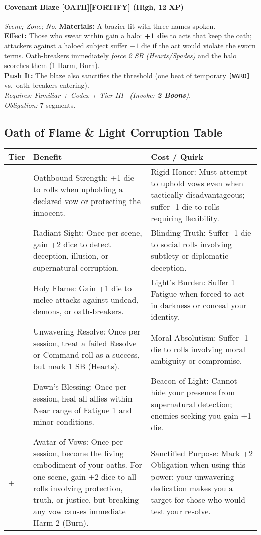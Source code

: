 \paragraph{Covenant Blaze \textnormal{[OATH][FORTIFY]} (High, 12 XP)} \emph{Scene; Zone; No.}
\textbf{Materials:} A brazier lit with three names spoken.\\
\textbf{Effect:} Those who swear within gain a halo: \textbf{+1 die} to acts that keep the oath; attackers against a haloed subject suffer \(-1\) die if the act would violate the sworn terms. Oath-breakers immediately \emph{force 2 SB (Hearts/Spades)} and the halo scorches them (1 Harm, Burn).\\
\textbf{Push It:} The blaze also sanctifies the threshold (one beat of temporary \texttt{[WARD]} vs.\ oath-breakers entering).\\
\emph{Requires: Familiar + Codex + Tier III \ (\textit{Invoke:} \textbf{2 Boons}).}\\
\emph{Obligation:} 7 segments.

\subsection*{Oath of Flame \& Light Corruption Table}
\label{sec:oath-flame-light-corruption}

\begin{longtable}{>{\raggedright\arraybackslash}p{1cm} p{5cm} p{5cm}}
\toprule
\textbf{Tier} & \textbf{Benefit} & \textbf{Cost / Quirk} \\
\midrule
1 & Oathbound Strength: +1 die to rolls when upholding a declared vow or protecting the innocent. & Rigid Honor: Must attempt to uphold vows even when tactically disadvantageous; suffer -1 die to rolls requiring flexibility. \\
\midrule
2 & Radiant Sight: Once per scene, gain +2 dice to detect deception, illusion, or supernatural corruption. & Blinding Truth: Suffer -1 die to social rolls involving subtlety or diplomatic deception. \\
\midrule
3 & Holy Flame: Gain +1 die to melee attacks against undead, demons, or oath-breakers. & Light's Burden: Suffer 1 Fatigue when forced to act in darkness or conceal your identity. \\
\midrule
4 & Unwavering Resolve: Once per session, treat a failed Resolve or Command roll as a success, but mark 1 SB (Hearts). & Moral Absolutism: Suffer -1 die to rolls involving moral ambiguity or compromise. \\
\midrule
5 & Dawn's Blessing: Once per session, heal all allies within Near range of Fatigue 1 and minor conditions. & Beacon of Light: Cannot hide your presence from supernatural detection; enemies seeking you gain +1 die. \\
\midrule
6+ & Avatar of Vows: Once per session, become the living embodiment of your oaths. For one scene, gain +2 dice to all rolls involving protection, truth, or justice, but breaking any vow causes immediate Harm 2 (Burn). & Sanctified Purpose: Mark +2 Obligation when using this power; your unwavering dedication makes you a target for those who would test your resolve. \\
\bottomrule
\end{longtable}